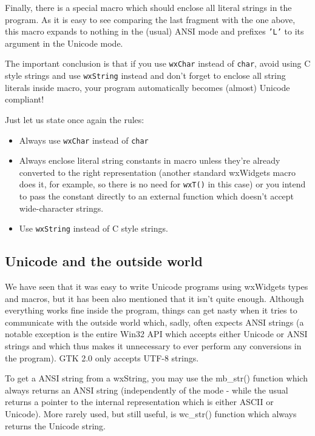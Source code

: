 Finally, there is a special  macro which should enclose all
literal strings in the program. As it is easy to see comparing the last
fragment with the one above, this macro expands to nothing in the (usual) ANSI
mode and prefixes {\tt 'L'} to its argument in the Unicode mode.

The important conclusion is that if you use {\tt wxChar} instead of 
{\tt char}, avoid using C style strings and use {\tt wxString} instead and
don't forget to enclose all string literals inside  macro, your
program automatically becomes (almost) Unicode compliant!

Just let us state once again the rules:

\begin{itemize}
\item Always use {\tt wxChar} instead of {\tt char}
\item Always enclose literal string constants in  macro
unless they're already converted to the right representation (another standard
wxWidgets macro  does it, for example, so there is no
need for {\tt wxT()} in this case) or you intend to pass the constant directly
to an external function which doesn't accept wide-character strings.
\item Use {\tt wxString} instead of C style strings.
\end{itemize}

\subsection{Unicode and the outside world}\label{unicodeoutsidewxw}

We have seen that it was easy to write Unicode programs using wxWidgets types
and macros, but it has been also mentioned that it isn't quite enough.
Although everything works fine inside the program, things can get nasty when
it tries to communicate with the outside world which, sadly, often expects
ANSI strings (a notable exception is the entire Win32 API which accepts either
Unicode or ANSI strings and which thus makes it unnecessary to ever perform
any conversions in the program). GTK 2.0 only accepts UTF-8 strings.

To get a ANSI string from a wxString, you may use the 
mb\_str() function which always returns an ANSI
string (independently of the mode - while the usual 
 returns a pointer to the internal
representation which is either ASCII or Unicode). More rarely used, but still
useful, is wc\_str() function which always returns
the Unicode string.


